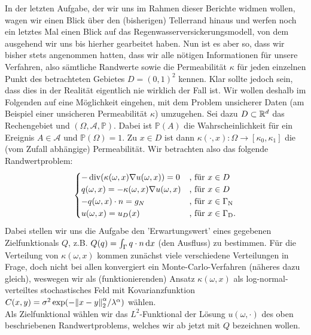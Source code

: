 In der letzten Aufgabe, der wir uns im Rahmen dieser Berichte widmen wollen, wagen wir einen Blick über den (bisherigen) Tellerrand hinaus und werfen noch ein letztes Mal einen Blick auf das Regenwasserversickerungsmodell, von dem ausgehend wir uns bis hierher gearbeitet haben. Nun ist es aber so, dass wir bisher stets angenommen hatten, dass wir alle nötigen Informationen für unsere Verfahren, also sämtliche Randwerte sowie die Permeabilität $\kappa$ für jeden einzelnen Punkt des betrachteten Gebietes $D=(0,1)^2$ kennen.
Klar sollte jedoch sein, dass dies in der Realität eigentlich nie wirklich der Fall ist. Wir wollen deshalb im Folgenden auf eine Möglichkeit eingehen, mit dem Problem unsicherer Daten (am Beispiel einer unsicheren Permeabilität $\kappa$)  umzugehen.
\newline
Sei dazu $D \subset \mathbb{R} ^d$ das Rechengebiet und $(\Omega,\mathcal{A} ,\mathbb{P})$. Dabei ist $\mathbb{P} (A)$ die Wahrscheinlichkeit für ein Ereignis $A \in \mathcal{A}$ und $\mathbb{P} (\Omega ) = 1$.
\newline
Zu $x \in D$ ist dann	$\kappa (\cdot ,x ) : \Omega \rightarrow [\kappa_0,\kappa_1] $ die (vom Zufall abhängige) Permeabilität.
Wir betrachten also das folgende Randwertproblem:
\begin{gather*}
	\begin{cases}
	- \operatorname{div}( \kappa(\omega,x)\nabla u(\omega,x))=0 &\text{, für } x \in D \\
	q(\omega , x) = - \kappa(\omega ,x) \nabla u(\omega , x) &\text{, für }  x \in D\\
	-q(\omega,x) \cdot n = g_N &\text{, für } x \in \Gamma_{\text{N}}\\
	u(\omega,x) = u_D(x) &\text{, für } x \in \Gamma_{\text{D}}. 
	\end{cases}
\end{gather*}
Dabei stellen wir uns die Aufgabe den 'Erwartungswert' eines gegebenen Zielfunktionals $Q$, z.B. $Q(q) = \int_{\Gamma} q \cdot n \mathop{}\!\mathrm{d} x $ (den Ausfluss) zu bestimmen.
Für die Verteilung von $\kappa (\omega,x )$ kommen zunächst viele verschiedene Verteilungen in Frage, doch nicht bei allen konvergiert ein Monte-Carlo-Verfahren (näheres dazu gleich), weswegen wir als (funktionierenden) Ansatz $\kappa (\omega,x )$  als log-normal-verteiltes stochastisches Feld mit Kovarianzfunktion $C(x,y)= \sigma^2 \exp ( - \norm{x-y}^{\alpha}_2 / \lambda^{\alpha})$ wählen. \\
Als Zielfunktional wählen wir das $L^2$-Funktional der Lösung $u(\omega,\cdot)$ des oben beschriebenen Randwertproblems, welches wir ab jetzt mit $Q$ bezeichnen wollen.
